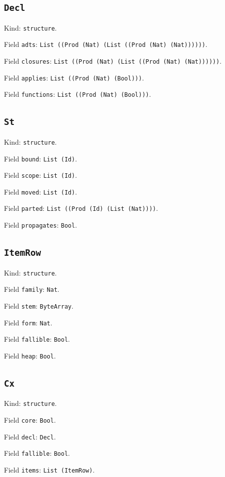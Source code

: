 \documentclass[11pt]{article}
\begin{document}
\subsection*{\texttt{Decl}}
\noindent Kind: \texttt{structure}.\par
\noindent Field \texttt{adts}: \texttt{List ((Prod (Nat) (List ((Prod (Nat) (Nat))))))}.\par
\noindent Field \texttt{closures}: \texttt{List ((Prod (Nat) (List ((Prod (Nat) (Nat))))))}.\par
\noindent Field \texttt{applies}: \texttt{List ((Prod (Nat) (Bool)))}.\par
\noindent Field \texttt{functions}: \texttt{List ((Prod (Nat) (Bool)))}.\par
\subsection*{\texttt{St}}
\noindent Kind: \texttt{structure}.\par
\noindent Field \texttt{bound}: \texttt{List (Id)}.\par
\noindent Field \texttt{scope}: \texttt{List (Id)}.\par
\noindent Field \texttt{moved}: \texttt{List (Id)}.\par
\noindent Field \texttt{parted}: \texttt{List ((Prod (Id) (List (Nat))))}.\par
\noindent Field \texttt{propagates}: \texttt{Bool}.\par
\subsection*{\texttt{ItemRow}}
\noindent Kind: \texttt{structure}.\par
\noindent Field \texttt{family}: \texttt{Nat}.\par
\noindent Field \texttt{stem}: \texttt{ByteArray}.\par
\noindent Field \texttt{form}: \texttt{Nat}.\par
\noindent Field \texttt{fallible}: \texttt{Bool}.\par
\noindent Field \texttt{heap}: \texttt{Bool}.\par
\subsection*{\texttt{Cx}}
\noindent Kind: \texttt{structure}.\par
\noindent Field \texttt{core}: \texttt{Bool}.\par
\noindent Field \texttt{decl}: \texttt{Decl}.\par
\noindent Field \texttt{fallible}: \texttt{Bool}.\par
\noindent Field \texttt{items}: \texttt{List (ItemRow)}.\par
\end{document}
